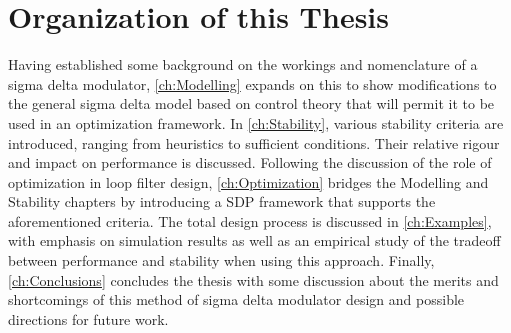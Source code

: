 \section{Organization of this Thesis}
\label{sec:in-org}

Having established some background on the workings and nomenclature of a sigma delta modulator, \autoref{ch:Modelling} expands on this to show modifications to the general sigma delta model based on control theory that will permit it to be used in an optimization framework. In \autoref{ch:Stability}, various stability criteria are introduced, ranging from heuristics to sufficient conditions. Their relative rigour and impact on performance is discussed. Following the discussion of the role of optimization in loop filter design, \autoref{ch:Optimization} bridges the Modelling and Stability chapters by introducing a \gls{SDP} framework that supports the aforementioned criteria. The total design process is discussed in \autoref{ch:Examples}, with emphasis on simulation results as well as an empirical study of the tradeoff between performance and stability when using this approach. Finally, \autoref{ch:Conclusions} concludes the thesis with some discussion about the merits and shortcomings of this method of sigma delta modulator design and possible directions for future work.

\endinput

Any text after an \endinput is ignored.
You could put scraps here or things in progress.
